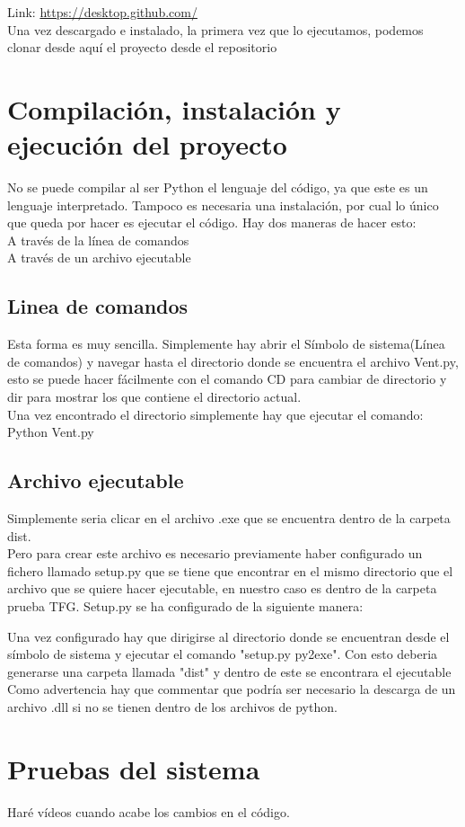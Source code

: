 Link: \url{https://desktop.github.com/}\\

Una vez descargado e instalado, la primera vez que lo ejecutamos, podemos clonar desde aquí el proyecto desde el repositorio

\section{Compilación, instalación y ejecución del proyecto}
No se puede compilar al ser Python el lenguaje del código, ya que este es un lenguaje interpretado. Tampoco es necesaria una instalación, por cual lo único que queda por hacer es ejecutar el código.
Hay dos maneras de hacer esto:\\

A través de la línea de comandos\\
A través de un archivo ejecutable\\

\subsection{Linea de comandos}
Esta forma es muy sencilla. Simplemente hay abrir el Símbolo de sistema(Línea de comandos) y navegar hasta el directorio donde se encuentra el archivo Vent.py, esto se puede hacer fácilmente con el comando CD para cambiar de directorio y dir para mostrar los que contiene el directorio actual.\\
Una vez encontrado el directorio simplemente hay que ejecutar el comando: Python Vent.py\\

\subsection{Archivo ejecutable}
Simplemente seria clicar en el archivo .exe que se encuentra dentro de la carpeta dist.\\

Pero para crear este archivo es necesario previamente haber configurado un fichero llamado setup.py que se tiene que encontrar en el mismo directorio que el archivo que se quiere hacer ejecutable, en nuestro caso es dentro de la carpeta prueba TFG. Setup.py se ha configurado de la siguiente manera: \\


Una vez configurado hay que dirigirse al directorio donde se encuentran desde el símbolo de sistema y ejecutar el comando "setup.py py2exe". Con esto deberia generarse una carpeta llamada "dist" y dentro de este se encontrara el ejecutable\\

Como advertencia hay que commentar que podría ser necesario la descarga de un archivo .dll si no se tienen dentro de los archivos de python. 


\section{Pruebas del sistema}
Haré vídeos cuando acabe los cambios en el código.